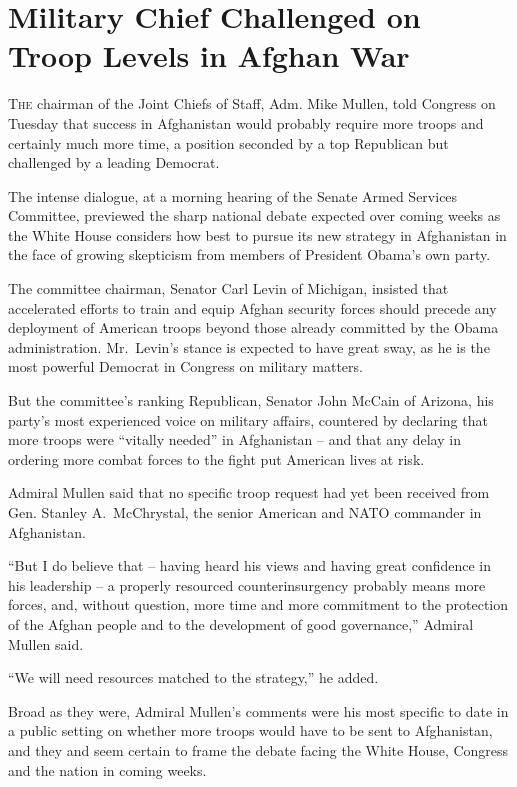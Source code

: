 ﻿\documentclass[12pt]{article}
\begin{document}
\section{Military Chief Challenged on Troop Levels in Afghan War}

\lettrine{T}{he} chairman of the Joint Chiefs of Staff, Adm. Mike Mullen, told Congress on Tuesday
that success in Afghanistan would probably require more troops and certainly much more time, a
position seconded by a top Republican but challenged by a leading Democrat.

The intense dialogue, at a morning hearing of the Senate Armed Services Committee, previewed the
sharp national debate expected over coming weeks as the White House considers how best to pursue its
new strategy in Afghanistan in the face of growing skepticism from members of President Obama's own
party.

The committee chairman, Senator Carl Levin of Michigan, insisted that accelerated efforts to train
and equip Afghan security forces should precede any deployment of American troops beyond those
already committed by the Obama administration. Mr.~Levin's stance is expected to have great sway, as
he is the most powerful Democrat in Congress on military matters.

But the committee's ranking Republican, Senator John McCain of Arizona, his party's most experienced
voice on military affairs, countered by declaring that more troops were ``vitally needed'' in
Afghanistan -- and that any delay in ordering more combat forces to the fight put American lives at
risk.

Admiral Mullen said that no specific troop request had yet been received from Gen. Stanley
A.~McChrystal, the senior American and NATO commander in Afghanistan.

``But I do believe that -- having heard his views and having great confidence in his leadership -- a
properly resourced counterinsurgency probably means more forces, and, without question, more time
and more commitment to the protection of the Afghan people and to the development of good
governance,'' Admiral Mullen said.

``We will need resources matched to the strategy,'' he added.

Broad as they were, Admiral Mullen's comments were his most specific to date in a public setting on
whether more troops would have to be sent to Afghanistan, and they and seem certain to frame the
debate facing the White House, Congress and the nation in coming weeks.
\end{document}

